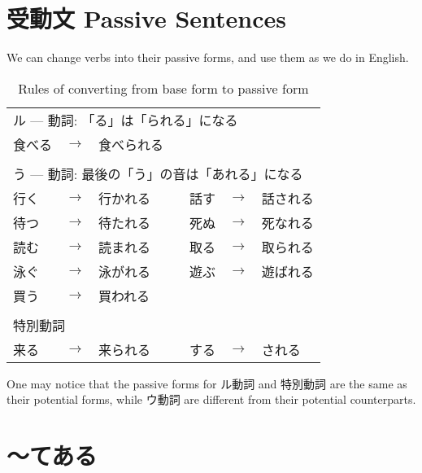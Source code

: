 \documentclass[notoc,notitlepage]{tufte-book}
\begin{document}

\section{受動文 Passive Sentences}%
\label{sec:jyudoubun_passive_sentences}

We can change verbs into their passive forms, and use them as we do in English.

\begin{table}[ht]
  \centering
  \caption{Rules of converting from base form to passive form}
  \label{table:rules_of_converting_from_base_form_to_passive_form}
  \begin{tabular}{l c l c l c l}
  \multicolumn{7}{l}{ル --- 動詞: 「る」は「られる」になる} \\
  食べる & $\to$ & 食べられる &  &  &  &  \\
  $  $ \\
  \multicolumn{7}{l}{う --- 動詞: 最後の「う」の音は「あれる」になる} \\
  行く & $\to$ & 行かれる & & 話す & $\to$ & 話される \\
  待つ & $\to$ & 待たれる & & 死ぬ & $\to$ & 死なれる \\
  読む & $\to$ & 読まれる & & 取る & $\to$ & 取られる \\
  泳ぐ & $\to$ & 泳がれる & & 遊ぶ & $\to$ & 遊ばれる \\
  買う & $\to$ & 買われる \\
  $  $ \\
  \multicolumn{7}{l}{特別動詞} \\
  来る & $\to$ & 来られる & & する & $\to$ & される
  \end{tabular}
\end{table}

\begin{note}
  One may notice that the passive forms for ル動詞 and 特別動詞
  are the same as their potential forms, while
  ウ動詞 are different from their potential counterparts.
\end{note}


\section{〜てある}%
\label{sec:tearu}
\end{document}
